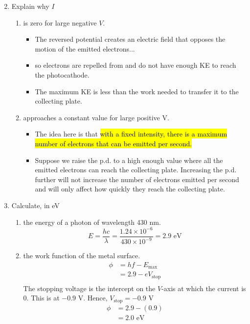 \documentclass[a4paper,12pt]{article}
\begin{document}
\begin{enumerate}[label=(\alph*)]
  \setcounter{enumi}{1}
  \item Explain why $I$
        \begin{enumerate}[label=(\roman*)]
          \item is zero for large negative $V$.
                \begin{itemize}
                  \item The reversed potential creates an electric field that opposes the motion of the emitted electrons...
                  \item so electrons are repelled from and do not have enough KE to reach the photocathode.
                  \item The maximum KE is less than the work needed to transfer it to the collecting plate.
                \end{itemize}
          \item approaches a constant value for large positive V.
                \begin{itemize}
                  \item The idea here is that \hl{with a fixed intensity, there is a maximum number of electrons that can be emitted per second.}
                  \item Suppose we raise the p.d. to a high enough value where all the emitted electrons can reach the collecting plate. Increasing the p.d. further will not increase the number of electrons emitted per second and will only affect how quickly they reach the collecting plate.
                \end{itemize}
        \end{enumerate}
  \item Calculate, in eV
        \begin{enumerate}[label=(\roman*)]
          \item the energy of a photon of wavelength 430 nm.
                $$E = \frac{hc}{\lambda} = \frac{1.24\times 10^{-6}}{430\times 10^{-9}} = 2.9 \text{ eV}$$
          \item the work function of the metal surface.
                \begin{align*}
                  \phi & = hf - E_\text{max}      \\
                       & = 2.9 - eV_{\text{stop}} \\
                \end{align*}
                The stopping voltage is the intercept on the $V$-axis at which the current is 0. This is at $-0.9$ V. Hence, $V_{\text{stop}} = -0.9$ V
                \begin{align*}
                  \phi & = 2.9 - (0.9)    \\
                       & = 2.0 \text{ eV} \\
                \end{align*}

        \end{enumerate}
\end{enumerate}
\end{document}
